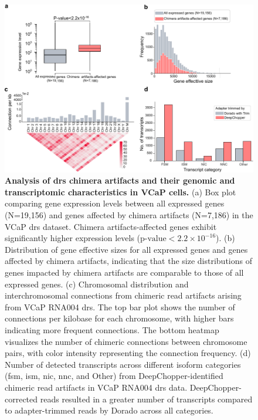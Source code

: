 \documentclass[pdflatex,sn-nature, lineno]{sn-jnl}%
\begin{document}
\begin{figure}[!ht]
	\includegraphics[height=0.65\columnwidth]{finals/sf4}
	\caption{ {\bf Analysis of \gls{drs} chimera artifacts and their genomic and transcriptomic characteristics in VCaP cells.} (a) Box plot comparing gene expression levels between all expressed genes (N=19,156) and genes affected by chimera artifacts (N=7,186) in the VCaP \gls{drs} dataset. Chimera artifacts-affected genes exhibit significantly higher expression levels (\(\textrm{p-value} < 2.2 \times 10^{-16}\)). (b) Distribution of gene effective sizes for all expressed genes and genes affected by chimera artifacts, indicating that the size distributions of genes impacted by chimera artifacts are comparable to those of all expressed genes. (c) Chromosomal distribution and interchromosomal connections from chimeric read artifacts arising from VCaP RNA004 \gls{drs}. The top bar plot shows the number of connections per kilobase for each chromosome, with higher bars indicating more frequent connections. The bottom heatmap visualizes the number of chimeric connections between chromosome pairs, with color intensity representing the connection frequency. (d) Number of detected transcripts across different isoform categories (\gls{fsm}, \gls{ism},  \gls{nic}, \gls{nnc}, and Other) from DeepChopper-identified chimeric read artifacts in VCaP RNA004 \gls{drs} data. DeepChopper-corrected reads resulted in a greater number of transcripts compared to adapter-trimmed reads by Dorado across all categories.}\label{fig:sf4}
\end{figure}


\end{document}

